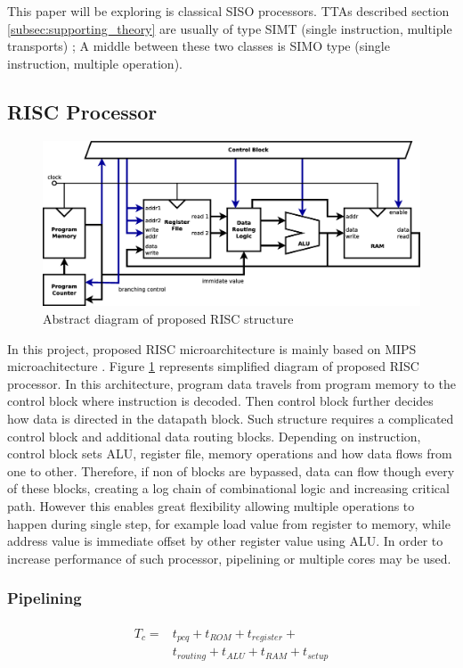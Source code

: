 This paper will be exploring is classical SISO processors. TTAs described section \ref{subsec:supporting_theory} are usually of type SIMT (single instruction, multiple transports) \autocite{289981}; A middle between these two classes is SIMO type (single instruction, multiple operation).

\subsection{RISC Processor}

\begin{figure}[t!]
	\centering
	\includegraphics[width=\linewidth]{../resources/risc.eps}
	\caption{Abstract diagram of proposed RISC structure}
	\label{fig:risc_simple}
\end{figure}

In this project, proposed RISC microarchitecture is mainly based on MIPS microachitecture \autocite{harris_harris_2013}. Figure \ref{fig:risc_simple} represents simplified diagram of proposed RISC processor. In this architecture, program data travels from program memory to the control block where instruction is decoded. Then control block further decides how data is directed in the datapath block. Such structure requires a complicated control block and additional data routing blocks. Depending on instruction, control block sets ALU, register file, memory operations and how data flows from one to other. Therefore, if non of blocks are bypassed, data can flow though every of these blocks, creating a log chain of combinational logic and increasing critical path. However this enables great flexibility allowing multiple operations to happen during single step, for example load value from register to memory, while address value is immediate offset by other register value using ALU. In order to increase performance of such processor, pipelining or multiple cores may be used.

\subsubsection{Pipelining}
\begin{multline}\label{eq:tc}
	\begin{split}
	T_c =& t_{pcq} + t_{ROM} + t_{register} + \\
	 	 & t_{routing} + t_{ALU} + t_{RAM} + t_{setup}
	\end{split}
\end{multline}

